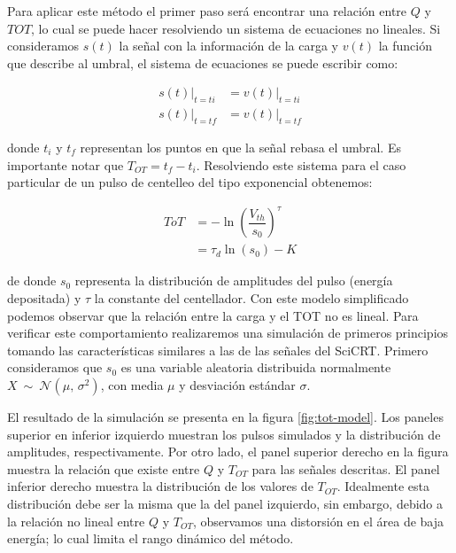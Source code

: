 Para aplicar este método el primer paso será encontrar una relación entre $Q$ y $TOT$, lo cual se puede hacer resolviendo un sistema de ecuaciones no lineales. Si consideramos $s\left(t\right)$ la señal con la información de la carga y $v\left(t\right)$ la función que describe al umbral, el sistema de ecuaciones se puede escribir como:

\begin{equation}
\label{equ:tot-equ}
\begin{aligned}
\left. s\left(t\right)\right|_{t=ti} &= \left. v\left(t\right)\right|_{t=ti}\\
\left. s\left(t\right)\right|_{t=tf} &= \left. v\left(t\right)\right|_{t=tf}
\end{aligned}
\end{equation}

donde $t_{i}$ y $t_{f}$ representan los puntos en que la señal rebasa el umbral. Es importante notar que $T_{OT}=t_{f}-t_{i}$. Resolviendo este sistema para el caso particular de un pulso de centelleo del tipo exponencial obtenemos:

\begin{equation}
\begin{aligned}
ToT &= -\ln\left(\dfrac{V_{th}}{s_{0}}\right)^{\tau}\\
 &= \tau_{d} \ln\left(s_{0}\right)-K
\end{aligned}
\end{equation}

de donde $s_{0}$ representa la distribución de amplitudes del pulso (energía depositada) y $\tau$ la constante del centellador. Con este modelo simplificado podemos observar que la relación entre la carga y el TOT no es lineal. Para verificar este comportamiento realizaremos una simulación de primeros principios tomando las características similares a las de las señales del SciCRT. Primero consideramos que $s_{0}$ es una variable aleatoria distribuida normalmente $X\ \sim\ \mathcal{N}\left(\mu,\,\sigma^2\right)$, con media $\mu$ y desviación estándar $\sigma$.

El resultado de la simulación se presenta en la figura \ref{fig:tot-model}. Los paneles superior en inferior izquierdo muestran los pulsos simulados y la distribución de amplitudes, respectivamente. Por otro lado, el panel superior derecho en la figura muestra la relación que existe entre $Q$ y $T_{OT}$ para las señales descritas. El panel inferior derecho muestra la distribución de los valores de $T_{OT}$. Idealmente esta distribución debe ser la misma que la del panel izquierdo, sin embargo, debido a la relación no lineal entre $Q$ y $T_{OT}$, observamos una distorsión en el área de baja energía; lo cual limita el rango dinámico del método.

